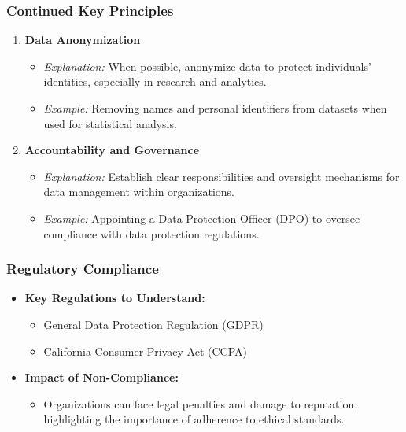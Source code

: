\documentclass{beamer}
\begin{document}
\begin{frame}[fragile]
    \frametitle{Continued Key Principles}
    \begin{enumerate}[resume]
        \item \textbf{Data Anonymization}
            \begin{itemize}
                \item \textit{Explanation:} When possible, anonymize data to protect individuals' identities, especially in research and analytics.
                \item \textit{Example:} Removing names and personal identifiers from datasets when used for statistical analysis.
            \end{itemize}
        \item \textbf{Accountability and Governance}
            \begin{itemize}
                \item \textit{Explanation:} Establish clear responsibilities and oversight mechanisms for data management within organizations.
                \item \textit{Example:} Appointing a Data Protection Officer (DPO) to oversee compliance with data protection regulations.
            \end{itemize}
    \end{enumerate}
\end{frame}

\begin{frame}[fragile]
    \frametitle{Regulatory Compliance}
    \begin{itemize}
        \item \textbf{Key Regulations to Understand:}
            \begin{itemize}
                \item General Data Protection Regulation (GDPR)
                \item California Consumer Privacy Act (CCPA)
            \end{itemize}
        \item \textbf{Impact of Non-Compliance:}
            \begin{itemize}
                \item Organizations can face legal penalties and damage to reputation, highlighting the importance of adherence to ethical standards.
            \end{itemize}
    \end{itemize}
\end{frame}
\end{document}
